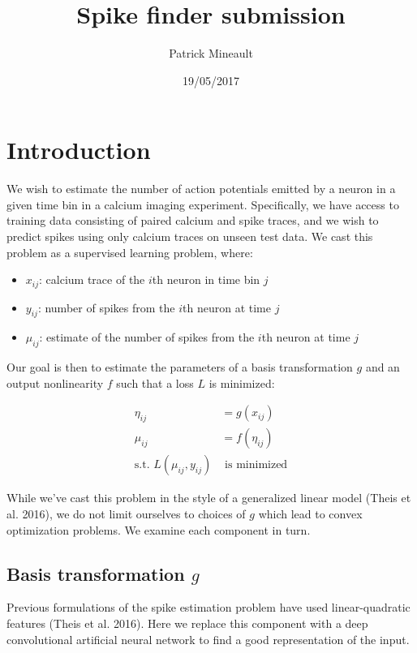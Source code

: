 \documentclass[]{article}
\title{Spike finder submission}
\author{Patrick Mineault}
\date{19/05/2017}
\providecommand{\tightlist}{%
  \setlength{\itemsep}{0pt}\setlength{\parskip}{0pt}}
\begin{document}
\maketitle

\section{Introduction}\label{introduction}

We wish to estimate the number of action potentials emitted by a neuron
in a given time bin in a calcium imaging experiment. Specifically, we
have access to training data consisting of paired calcium and spike
traces, and we wish to predict spikes using only calcium traces on
unseen test data. We cast this problem as a supervised learning problem,
where:

\begin{itemize}
\tightlist
\item
  \(x_{ij}\): calcium trace of the \(i\)th neuron in time bin \(j\)
\item
  \(y_{ij}\): number of spikes from the \(i\)th neuron at time \(j\)
\item
  \(\mu_{ij}\): estimate of the number of spikes from the \(i\)th neuron
  at time \(j\)
\end{itemize}

Our goal is then to estimate the parameters of a basis transformation
\(g\) and an output nonlinearity \(f\) such that a loss \(L\) is
minimized:

\begin{align*}
\eta_{ij} &= g(x_{ij}) \\
\mu_{ij} &= f(\eta_{ij}) \\
\text{s.t. } L(\mu_{ij}, y_{ij}) & \text{ is minimized}
\end{align*}

While we've cast this problem in the style of a generalized linear model
(Theis et al. 2016), we do not limit ourselves to choices of \(g\) which
lead to convex optimization problems. We examine each component in turn.

\subsection{\texorpdfstring{Basis transformation
\(g\)}{Basis transformation g}}\label{basis-transformation-g}

Previous formulations of the spike estimation problem have used
linear-quadratic features (Theis et al. 2016). Here we replace this
component with a deep convolutional artificial neural network to find a
good representation of the input.
\end{document}
